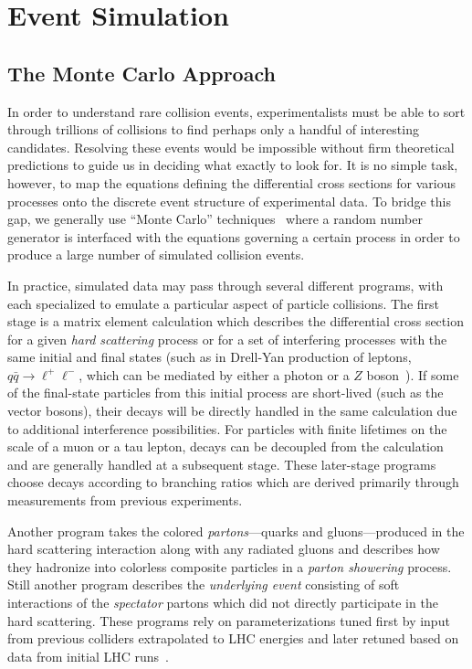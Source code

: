 \chapter{Event Simulation}
\label{chapter:simulation}

\section{The Monte Carlo Approach}

In order to understand rare collision events, experimentalists must be able to sort through trillions of collisions to find perhaps only a handful of interesting candidates.  Resolving these events would be impossible without firm theoretical predictions to guide us in deciding what exactly to look for.  It is no simple task, however, to map the equations defining the differential cross sections for various processes onto the discrete event structure of experimental data.  To bridge this gap, we generally use ``Monte Carlo'' techniques~\cite{MonteCarloMethod} where a random number generator is interfaced with the equations governing a certain process in order to produce a large number of simulated collision events.

In practice, simulated data may pass through several different programs, with each specialized to emulate a particular aspect of particle collisions.  The first stage is a matrix element calculation which describes the differential cross section for a given \emph{hard scattering} process or for a set of interfering processes with the same initial and final states (such as in Drell-Yan production of leptons, $q\bar{q} \to \ell^+ \ell^-$, which can be mediated by either a photon or a $Z$ boson~\cite{PhysRevLett.25.316}).  If some of the final-state particles from this initial process are short-lived (such as the vector bosons), their decays will be directly handled in the same calculation due to additional interference possibilities.  For particles with finite lifetimes on the scale of a muon or a tau lepton, decays can be decoupled from the calculation and are generally handled at a subsequent stage.  These later-stage programs choose decays according to branching ratios which are derived primarily through measurements from previous experiments.

Another program takes the colored \emph{partons}---quarks and gluons---produced in the hard scattering interaction along with any radiated gluons and describes how they hadronize into colorless composite particles in a \emph{parton showering} process.  Still another program describes the \emph{underlying event} consisting of soft interactions of the \emph{spectator} partons which did not directly participate in the hard scattering. These programs rely on parameterizations tuned first by input from previous colliders extrapolated to LHC energies and later retuned based on data from initial LHC runs~\cite{Moraes:2007rq,springerlink:10.1007/JHEP01(2011)079}.

